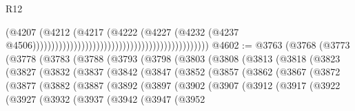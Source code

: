 \begin{lexlean}{R12}
\begin{coremodule}
                                                                                    (@4207
                                                                                      (@4212
                                                                                        (@4217
                                                                                          (@4222
                                                                                            (@4227
                                                                                              (@4232
                                                                                                (@4237
                                                                                                  @4506)))))))))))))))))))))))))))))))))))))))))))))))
@4602 := @3763
    (@3768
      (@3773
        (@3778
          (@3783
            (@3788
              (@3793
                (@3798
                  (@3803
                    (@3808
                      (@3813
                        (@3818
                          (@3823
                            (@3827
                              (@3832
                                (@3837
                                  (@3842
                                    (@3847
                                      (@3852
                                        (@3857
                                          (@3862
                                            (@3867
                                              (@3872
                                                (@3877
                                                  (@3882
                                                    (@3887
                                                      (@3892
                                                        (@3897
                                                          (@3902
                                                            (@3907
                                                              (@3912
                                                                (@3917
                                                                  (@3922
                                                                    (@3927
                                                                      (@3932
                                                                        (@3937
                                                                          (@3942
                                                                            (@3947
                                                                              (@3952

\end{coremodule}
\end{lexlean}
